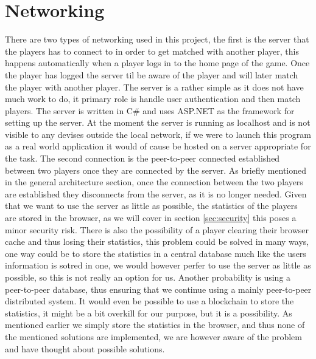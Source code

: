 \documentclass[ twoside,openright,titlepage,numbers=noenddot,headinclude,%
                footinclude=true,cleardoublepage=empty,abstractoff, %
                BCOR=5mm,paper=a4,fontsize=11pt,%
                ngerman,american,%
                ]{scrreprt}
\begin{document}
\section{Networking}
There are two types of networking used in this project, the first is the server that the players has to connect to in order to get matched with another player, this happens automatically when a player logs in to the home page of the game. Once the player has logged the server til be aware of the player and will later match the player with another player. The server is a rather simple as it does not have much work to do, it primary role is handle user authentication and then match players. The server is written in C\# and uses ASP.NET as the framework for setting up the server. At the moment the server is running as localhost and is not visible to any devises outside the local network, if we were to launch this program as a real world application it would of cause be hosted on a server appropriate for the task. The second connection is the peer-to-peer connected established between two players once they are connected by the server. As briefly mentioned in the general architecture section, once the connection between the two players are established they disconnects from the server, as it is no longer needed. 
Given that we want to use the server as little as possible, the statistics of the players are stored in the browser, as we will cover in section \ref{sec:security} this poses a minor security risk. There is also the possibility of a player clearing their browser cache and thus losing their statistics, this problem could be solved in many ways, one way could be to store the statistics in a central database much like the users information is sotred in one, we would however perfer to use the server as little as possible, so this is not really an option for us. Another probability is using a peer-to-peer database, thus ensuring that we continue using a mainly peer-to-peer distributed system. It would even be possible to use a blockchain to store the statistics, it might be a bit overkill for our purpose, but it is a possibility. As mentioned earlier we simply store the statistics in the browser, and thus none of the mentioned solutions are implemented, we are however aware of the problem and have thought about possible solutions.
\end{document}
